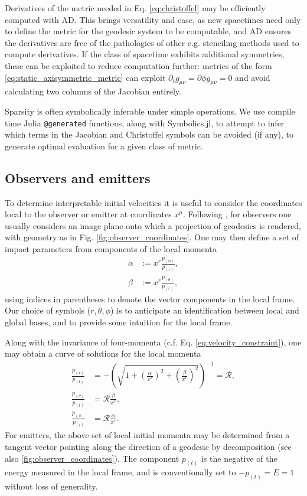Derivatives of the metric needed in Eq. \eqref{eq:christoffel} may be efficiently computed with AD. This brings versatility and ease, as new spacetimes need only to define the metric for the geodesic system to be computable, and AD ensures the derivatives are free of the pathologies of other e.g. stenciling methods used to compute derivatives. If the class of spacetime exhibits additional symmetries, these can be exploited to reduce computation further: metrics of the form \eqref{eq:static_axisymmetric_metric} can exploit $\partial_t g_{\mu\nu} = \partial{\phi} g_{\mu\nu} = 0$ and avoid calculating two columns of the Jacobian entirely.

Sparsity is often symbolically inferable under simple operations. We use compile time Julia \texttt{@generated} functions, along with Symbolics.jl, to attempt to infer which terms in the Jacobian and Christoffel symbols can be avoided (if any), to generate optimal evaluation for a given class of metric. 


\subsection{Observers and emitters}

To determine interpretable initial velocities it is useful to consider the coordinates local to the observer or emitter at coordinates $x^\mu$. Following \cite{cunningham_optical_1973}, for observers one usually considers an image plane onto which a projection of geodesics is rendered, with geometry as in Fig. \ref{fig:observer_coordinates}. One may then define a set of impact parameters from components of the local momenta
\begin{align}
    \alpha &:=  x^r \frac{p_{(\phi)}}{p_{(r)}}, \\
    \beta &:= x^r \frac{p_{(\theta)}}{p_{(r)}},
\end{align}
using indices in parentheses to denote the vector components in the local frame. Our choice of symbols ($r, \theta, \phi$) is to anticipate an identification between local and global bases, and to provide some intuition for the local frame.

Along with the invariance of four-momenta (c.f. Eq. \eqref{eq:velocity_constraint}), one may obtain a curve of solutions for the local momenta
\begin{align}
    \frac{p_{(r)}}{p_{(t)}} &= -\left( \sqrt{1 + \left(\frac{\alpha}{x^r}\right)^2 + \left(\frac{\beta}{x^r}\right)^2} \right)^{-1} = \mathscr{R}, \\
    \frac{p_{(\theta)}}{p_{(t)}} &= \mathscr{R} \frac{\beta}{x^r}, \\
    \frac{p_{(\phi)}}{p_{(t)}} &= \mathscr{R} \frac{\alpha}{x^r}.
\end{align}
For emitters, the above set of local initial momenta may be determined from a tangent vector pointing along the direction of a geodesic by decomposition (see also \ref{fig:observer_coordinates}). The component $p_{(t)}$ is the negative of the energy measured in the local frame, and is conventionally set to $-p_{(t)} = E = 1$ without loss of generality. 

